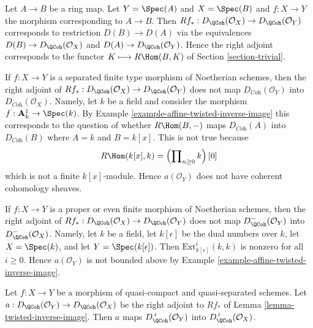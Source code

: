 \begin{example}
\label{example-affine-twisted-inverse-image}
Let $A \to B$ be a ring map. Let $Y = \Spec(A)$ and $X = \Spec(B)$
and $f : X \to Y$ the morphism corresponding to $A \to B$.
Then $Rf_* : D_\QCoh(\mathcal{O}_X) \to D_\QCoh(\mathcal{O}_Y)$
corresponds to restriction $D(B) \to D(A)$ via
the equivalences $D(B) \to D_\QCoh(\mathcal{O}_X)$ and
$D(A) \to D_\QCoh(\mathcal{O}_Y)$. Hence the right adjoint
corresponds to the functor $K \longmapsto R\Hom(B, K)$ of
Section \ref{section-trivial}.
\end{example}

\begin{example}
\label{example-does-not-preserve-coherent}
If $f : X \to Y$ is a separated finite type morphism of Noetherian schemes,
then the right adjoint of
$Rf_* : D_\QCoh(\mathcal{O}_X) \to D_\QCoh(\mathcal{O}_Y)$ does not map
$D_{\textit{Coh}}(\mathcal{O}_Y)$ into
$D_{\textit{Coh}}(\mathcal{O}_X)$. Namely, let $k$ be a field and
consider the morphism $f : \mathbf{A}^1_k \to \Spec(k)$. By
Example \ref{example-affine-twisted-inverse-image}
this corresponds to the question of whether
$R\Hom(B, -)$ maps $D_{\textit{Coh}}(A)$ into $D_{\textit{Coh}}(B)$
where $A = k$ and $B = k[x]$. This is not true because
$$
R\Hom(k[x], k) = \left(\prod\nolimits_{n \geq 0} k\right)[0]
$$
which is not a finite $k[x]$-module. Hence $a(\mathcal{O}_Y)$
does not have coherent cohomology sheaves.
\end{example}

\begin{example}
\label{example-does-not-preserve-bounded-above}
If $f : X \to Y$ is a proper or even finite morphism of Noetherian schemes,
then the right adjoint of
$Rf_* : D_\QCoh(\mathcal{O}_X) \to D_\QCoh(\mathcal{O}_Y)$
does not map $D_\QCoh^-(\mathcal{O}_Y)$ into
$D_\QCoh^-(\mathcal{O}_X)$. Namely, let $k$ be a field, let
$k[\epsilon]$ be the dual numbers over $k$, let
$X = \Spec(k)$, and let $Y = \Spec(k[\epsilon])$.
Then $\text{Ext}^i_{k[\epsilon]}(k, k)$ is nonzero for all $i \geq 0$.
Hence $a(\mathcal{O}_Y)$ is not bounded above
by Example \ref{example-affine-twisted-inverse-image}.
\end{example}

\begin{lemma}
\label{lemma-twisted-inverse-image-bounded-below}
Let $f : X \to Y$ be a morphism of quasi-compact and quasi-separated
schemes. Let $a : D_\QCoh(\mathcal{O}_Y) \to D_\QCoh(\mathcal{O}_X)$
be the right adjoint to $Rf_*$ of Lemma \ref{lemma-twisted-inverse-image}.
Then $a$ maps $D^+_\QCoh(\mathcal{O}_Y)$ into $D^+_\QCoh(\mathcal{O}_X)$.
\end{lemma}


